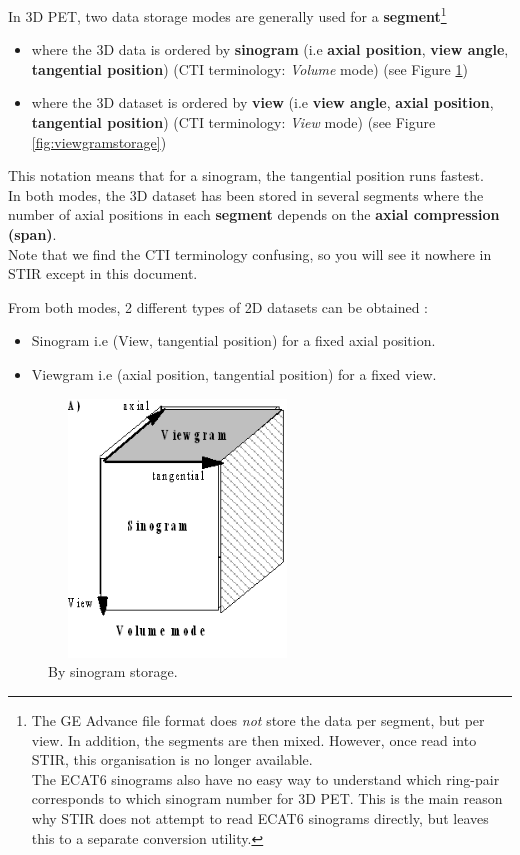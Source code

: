\documentclass{article}
\begin{document}
In 3D PET, two data storage modes are generally used for a \textbf{segment}\footnote{{The 
GE Advance file format does \textit{not} store the data per segment, 
but per view. In addition, the segments are then mixed. However, 
once read into STIR, this organisation is no longer available. 
\\
The ECAT6 sinograms also have no easy way to understand which 
ring-pair corresponds to which sinogram number for 3D PET. This 
is the main reason why STIR does not attempt to read ECAT6 sinograms 
directly, but leaves this to a separate conversion utility.}}
\begin{itemize}
\item 
where the 3D data is ordered by \textbf{sinogram} (i.e \textbf{axial position}, \textbf{view 
angle}, \textbf{tangential position}) (CTI terminology: \textit{Volume} mode) 
(see Figure \ref{fig:sinogramstorage})
\item where the 3D dataset is ordered by \textbf{view} (i.e \textbf{view angle}, \textbf{axial 
position}, \textbf{tangential position}) (CTI terminology: \textit{View}  
mode) (see Figure \ref{fig:viewgramstorage})
\end{itemize}

This notation means that for a sinogram, the tangential position 
runs fastest.\\
In both modes, the 3D dataset has been stored in several segments 
where the number of axial positions in each \textbf{segment} depends 
on the \textbf{axial compression (span)}.\\
Note that we find the CTI terminology confusing, so you will 
see it nowhere in STIR except in this document.


From both modes, 2 different types of 2D datasets can be obtained 
:
\begin{itemize}
\item Sinogram i.e (View, tangential position) for a fixed axial 
position.
\item Viewgram i.e (axial position, tangential position) for a fixed 
view.
\end{itemize} 


\begin{figure}[htbp]
\begin{center}
\includegraphics[width=2.7in, height=2.7in]{graphics/STIR-developers-overviewFig3}
\caption{By sinogram storage.}
\label{fig:sinogramstorage}
\end{center}
\end{figure}
\end{document}
